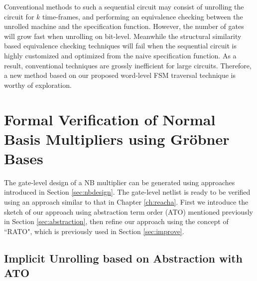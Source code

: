 Conventional methods to such a sequential circuit may consist of unrolling the circuit for 
$k$ time-frames, and performing an equivalence checking between the unrolled machine and
the specification function. However, the number of gates will grow fast when unrolling
on bit-level. Meanwhile the structural similarity based equivalence checking techniques 
will fail when the sequential circuit is highly customized and optimized from the naive specification 
function. As a result, conventional techniques are grossly inefficient for large circuits.
Therefore, a new method based on our proposed word-level FSM traversal technique is worthy of exploration.

\section{Formal Verification of Normal Basis Multipliers using Gr\"obner Bases}
The gate-level design of a NB multiplier can be generated using approaches introduced in 
Section \ref{sec:nbdesign}. The gate-level netlist is ready to be verified using 
an approach similar to that in Chapter \ref{ch:reacha}. 
First we introduce the sketch of our approach using abstraction term order (ATO)
mentioned previously in Section \ref{sec:abstraction}, then refine our approach using 
the concept of ``RATO", which is previously used in Section \ref{sec:improve}.
\subsection{Implicit Unrolling based on Abstraction with ATO}
\begin{figure}[H]
\end{figure}

